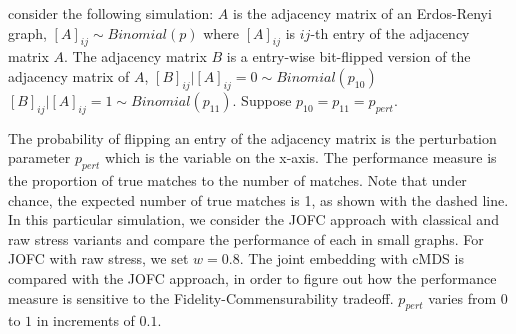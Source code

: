 \documentclass[12pt,oneside,final]{thesis}\usepackage[]{graphicx}\usepackage[]{color}
\begin{document}
  consider the following simulation: $A$ is the adjacency matrix of an Erdos-Renyi graph, \ie
  $\left[A\right]_{ij} \sim Binomial(p)$ where $\left[A\right]_{ij}$ is $ij$-th entry of the adjacency matrix  $A$. The adjacency matrix  $B$ is a entry-wise bit-flipped version of the adjacency matrix of $A$, \ie
    $\left[B\right]_{ij}|\left[A\right]_{ij}=0 \sim Binomial(p_{10})$ $\left[B\right]_{ij}|\left[A\right]_{ij}=1 \sim Binomial(p_{11})$. Suppose $p_{10}=p_{11}=p_{pert}$.
  
  The probability of flipping an entry of the adjacency matrix is the perturbation parameter $p_{pert}$ which is the variable on the x-axis. 
  The performance measure is the proportion of true matches to the number of matches. Note that 
  under chance, the expected number of true matches is 1, as shown with the dashed line. In this particular simulation, we consider the JOFC approach with classical and raw stress variants and compare the performance of each in small graphs. For JOFC with raw stress, we set $w=0.8$. The joint embedding with cMDS is compared with  the JOFC approach, in order to figure out how the performance measure is sensitive to the Fidelity-Commensurability tradeoff. 
  $p_{pert}$ varies from $0$ to $1$ in increments of $0.1$.  
  



  

 
\end{document}
